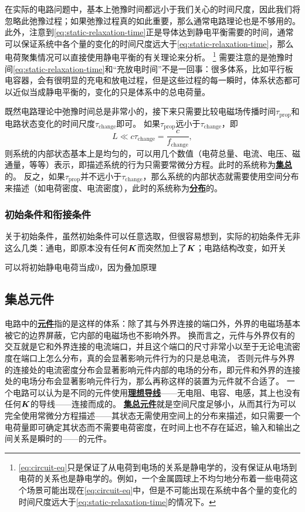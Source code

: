 \documentclass[UTF8, a4paper]{ctexart}
\newcommand*{\concept}[1]{\underline{\textbf{#1}}}
\begin{document}
在实际的电路问题中，基本上弛豫时间都远小于我们关心的时间尺度，因此我们将忽略此弛豫过程；如果弛豫过程真的如此重要，那么通常电路理论也是不够用的。
此外，注意到\eqref{eq:static-relaxation-time}正是导体达到静电平衡需要的时间，通常可以保证系统中各个量的变化的时间尺度远大于\eqref{eq:static-relaxation-time}，那么电荷聚集情况可以直接使用静电平衡的有关理论来分析。%
\footnote{\eqref{eq:circuit-eq}只是保证了从电荷到电场的关系是静电学的，没有保证从电场到电荷的关系也是静电学的。例如，一个金属圆球上不均匀地分布着一些电荷这个场景可能出现在\eqref{eq:circuit-eq}中，但是不可能出现在系统中各个量的变化的时间尺度远大于\eqref{eq:static-relaxation-time}的情况下。}%
需要注意的是弛豫时间\eqref{eq:static-relaxation-time}和“充放电时间”不是一回事：很多体系，比如平行板电容器，会有很明显的充电和放电过程，但是这些过程的每一瞬时，体系状态都可以近似当成静电平衡的，变化的只是体系中的总电荷量。

既然电路理论中弛豫时间总是非常小的，接下来只需要比较电磁场传播时间$\tau_\text{prop}$和电路状态变化的时间尺度$\tau_\text{change}$即可。
如果$\tau_\text{prop}$远小于$\tau_\text{change}$，即
\begin{equation}
    L \ll c \tau_\text{change} = \frac{c}{f_\text{change}},
\end{equation}
则系统的内部状态基本上是均匀的，可以用几个数值（电荷总量、电流、电压、磁通量，等等）表示，即描述系统的行为只需要常微分方程。此时的系统称为\concept{集总}的。
反之，如果$\tau_\text{prop}$并不远小于$\tau_\text{change}$，那么系统的内部状态就需要使用空间分布来描述（如电荷密度、电流密度），此时的系统称为\concept{分布}的。

\subsubsection{初始条件和衔接条件}

关于初始条件，虽然初始条件可以任意选取，但很容易想到，实际的初始条件无非这么几类：通电，即原本没有任何$\vb*{K}$而突然加上了$\vb*{K}$；电路结构改变，如开关


可以将初始静电电荷当成0，因为叠加原理 %

\subsection{集总元件}

电路中的\concept{元件}指的是这样的体系：除了其与外界连接的端口外，外界的电磁场基本被它的边界屏蔽，它内部的电磁场也不影响外界。
换而言之，元件与外界仅有的交互就是它和外界连接的电流端口，并且这个端口的尺寸非常小以至于无论电流密度在端口上怎么分布，真的会显著影响元件行为的只是总电流，
否则元件与外界的连接处的电流密度分布会显著影响元件内部的电场的分布，即元件和外界的连接处的电场分布会显著影响元件行为，那么再称这样的装置为元件就不合适了。
一个电路可以认为是不同的元件使用\concept{理想导线}——无电阻、电容、电感，其上也没有任何$\vb*{K}$的导线——连接而成的。
\concept{集总元件}就是空间尺度足够小，从而其行为可以完全使用常微分方程描述——其状态无需使用空间上的分布来描述，如只需要一个电荷量即可确定其状态而不需要电荷密度，在时间上也不存在延迟，输入和输出之间关系是瞬时的——的元件。
\end{document}
